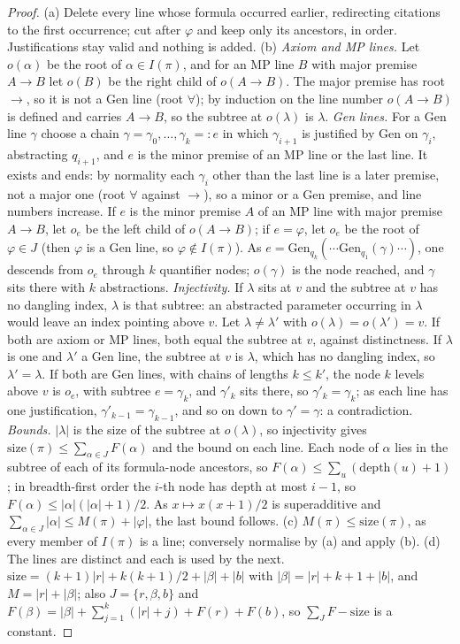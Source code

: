 \begin{proof}
(a) Delete every line whose formula occurred earlier, redirecting citations to the first occurrence; cut after $\varphi$ and keep only its ancestors, in order. Justifications stay valid and nothing is added.
(b) \emph{Axiom and MP lines.} Let $o(\alpha)$ be the root of $\alpha\in I(\pi)$, and for an MP line $B$ with major premise $A\to B$ let $o(B)$ be the right child of $o(A\to B)$. The major premise has root $\to$, so it is not a Gen line (root $\forall$); by induction on the line number $o(A\to B)$ is defined and carries $A\to B$, so the subtree at $o(\lambda)$ is $\lambda$.
\emph{Gen lines.} For a Gen line $\gamma$ choose a chain $\gamma=\gamma_0,\dots,\gamma_k=:e$ in which $\gamma_{i+1}$ is justified by Gen on $\gamma_i$, abstracting $q_{i+1}$, and $e$ is the minor premise of an MP line or the last line. It exists and ends: by normality each $\gamma_i$ other than the last line is a later premise, not a major one (root $\forall$ against $\to$), so a minor or a Gen premise, and line numbers increase. If $e$ is the minor premise $A$ of an MP line with major premise $A\to B$, let $o_e$ be the left child of $o(A\to B)$; if $e=\varphi$, let $o_e$ be the root of $\varphi\in J$ (then $\varphi$ is a Gen line, so $\varphi\notin I(\pi)$). As $e=\mathrm{Gen}_{q_k}(\cdots\mathrm{Gen}_{q_1}(\gamma)\cdots)$, one descends from $o_e$ through $k$ quantifier nodes; $o(\gamma)$ is the node reached, and $\gamma$ sits there with $k$ abstractions.
\emph{Injectivity.} If $\lambda$ sits at $v$ and the subtree at $v$ has no dangling index, $\lambda$ is that subtree: an abstracted parameter occurring in $\lambda$ would leave an index pointing above $v$. Let $\lambda\ne\lambda'$ with $o(\lambda)=o(\lambda')=v$. If both are axiom or MP lines, both equal the subtree at $v$, against distinctness. If $\lambda$ is one and $\lambda'$ a Gen line, the subtree at $v$ is $\lambda$, which has no dangling index, so $\lambda'=\lambda$. If both are Gen lines, with chains of lengths $k\le k'$, the node $k$ levels above $v$ is $o_e$, with subtree $e=\gamma_k$, and $\gamma'_k$ sits there, so $\gamma'_k=\gamma_k$; as each line has one justification, $\gamma'_{k-1}=\gamma_{k-1}$, and so on down to $\gamma'=\gamma$: a contradiction.
\emph{Bounds.} $|\lambda|$ is the size of the subtree at $o(\lambda)$, so injectivity gives $\mathrm{size}(\pi)\le\sum_{\alpha\in J}F(\alpha)$ and the bound on each line. Each node of $\alpha$ lies in the subtree of each of its formula-node ancestors, so $F(\alpha)\le\sum_u(\mathrm{depth}(u)+1)$; in breadth-first order the $i$-th node has depth at most $i-1$, so $F(\alpha)\le|\alpha|(|\alpha|+1)/2$. As $x\mapsto x(x+1)/2$ is superadditive and $\sum_{\alpha\in J}|\alpha|\le M(\pi)+|\varphi|$, the last bound follows.
(c) $M(\pi)\le\mathrm{size}(\pi)$, as every member of $I(\pi)$ is a line; conversely normalise by (a) and apply (b).
(d) The lines are distinct and each is used by the next. $\mathrm{size}=(k+1)|r|+k(k+1)/2+|\beta|+|b|$ with $|\beta|=|r|+k+1+|b|$, and $M=|r|+|\beta|$; also $J=\{r,\beta,b\}$ and $F(\beta)=|\beta|+\sum_{j=1}^k(|r|+j)+F(r)+F(b)$, so $\sum_JF-\mathrm{size}$ is a constant.
\end{proof}

